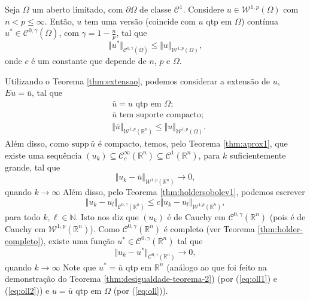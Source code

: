 \documentclass[a4paper, 11pt]{book}
\theoremstyle{definition}
\newcommand{\bN}{\mathbb{N}}
\newcommand{\bR}{\mathbb{R}}
\newcommand{\cC}{\mathcal{C}}
\newcommand{\cW}{\mathcal{W}}
\newcommand{\supp}{\mathrm{supp}\,}
\begin{document}
\begin{tbox}
    Seja $\Omega$ um aberto limitado, com $\partial\Omega$ de classe $\cC^1$.
    Considere $u \in \cW^{1,p}(\Omega)$ com $n < p \leqslant \infty$.
    Então, $u$ tem uma versão (coincide com $u$ qtp em $\Omega$) contínua $u^* \in \cC^{0,\gamma}(\overline\Omega)$, com $\gamma = 1 - \frac{n}{p}$, tal que
    \[
        \Vert u^*  \Vert_{\cC^{0,\gamma}(\overline\Omega)} \leqslant \Vert u \Vert_{\cW^{1,p}(\Omega)},
    \]
    onde $c$ é um constante que depende de $n$, $p$ e $\Omega$.
\end{tbox}
\begin{prf}
    Utilizando o Teorema \ref{thm:extensao}, podemos considerar a extensão de $u$, $Eu = \bar u$, tal que
    \begin{equation} \label{eq:oll}
        \begin{aligned}
            &\bar u = u \text{ qtp em } \Omega;\\
            &\bar u \text{ tem suporte compacto};\\
            &\Vert \bar u \Vert_{\cW^{1,p}(\bR^n)} \leqslant \Vert u \Vert_{\cW^{1,p}(\Omega)}.
        \end{aligned}
    \end{equation}
    Além disso, como $\supp \bar u$ é compacto, temos, pelo Teorema \ref{thm:aprox1}, que existe uma sequência $(u_k) \subseteq \cC^\infty_c(\bR^n) \subseteq \cC^1(\bR^n)$, para $k$ suficientemente grande, tal que
    \begin{equation} \label{eq:oll1}
        \Vert u_k - \bar u \Vert_{\cW^{1,p}(\bR^n)} \to 0,
    \end{equation}
    quando $k \to \infty$
    Além disso, pelo Teorema \ref{thm:holdersobolev1}, podemos escrever
    \[
        \Vert u_k -u_l \Vert_{\cC^{0,\gamma}(\bR^n)} \leqslant c \Vert u_k - u_l \Vert_{\cW^{1,p}(\bR^n)},
    \]
    para todo $k, \ell \in \bN$.
    Isto nos diz que $(u_k)$ é de Cauchy em $\cC^{0,\gamma}(\bR^n)$ (pois é de Cauchy em $\cW^{1,p}(\bR^n)$).
    Como $\cC^{0,\gamma}(\bR^n)$ é completo (ver Teorema \ref{thm:holder-completo}), existe uma função $u^* \in \cC^{0,\gamma}(\bR^n)$ tal que
    \begin{equation} \label{eq:oll2}
        \Vert u_k - u^* \Vert_{\cC^{0,\gamma}(\bR^n)} \to 0,
    \end{equation}
    quando $k \to \infty$
    Note que $u^* = \bar u$ qtp em $\bR^n$ (análogo ao que foi feito na demonstração do Teorema \ref{thm:desigualdade-teorema-2}) (por (\ref{eq:oll1}) e (\ref{eq:oll2})) e $u = \bar u$ qtp em $\Omega$ (por (\ref{eq:oll})).

\end{prf}
\end{document}
